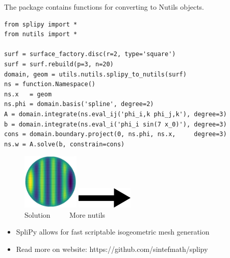 \documentclass[landscape]{sintefposter}
\begin{document}
\begin{multicols}{3}
\vspace{-3.5cm}
\begin{tcolorbox}[colback=white,colframe=sintefblue,title=Integration with Nutils]
  The package contains functions for converting to Nutils objects.
  \begin{tcolorbox}[colback=sinteflightgrey]
  \begin{Verbatim}[fontsize=\footnotesize]
from splipy import *
from nutils import *

surf = surface_factory.disc(r=2, type='square')
surf = surf.rebuild(p=3, n=20)
domain, geom = utils.nutils.splipy_to_nutils(surf)
ns = function.Namespace()
ns.x   = geom
ns.phi = domain.basis('spline', degree=2)
A = domain.integrate(ns.eval_ij('phi_i,k phi_j,k'), degree=3)
b = domain.integrate(ns.eval_i('phi_i sin(7 x_0)'), degree=3)
cons = domain.boundary.project(0, ns.phi, ns.x,     degree=3)
ns.w = A.solve(b, constrain=cons)
\end{Verbatim}
  \end{tcolorbox}
\end{tcolorbox}
\vspace{-1cm}
\begin{figure}
  \begin{center}
    \includegraphics[width=0.24\textwidth]{nutilssolution}
    \includegraphics[width=0.24\textwidth]{right.png} \\
    Solution $\quad\quad$ More nutils
  \end{center}
\end{figure}


\begin{tcolorbox}[colback=sintefblue!10!white,colframe=sintefblue,title=Conclusion]
  \begin{itemize}
    \item SpliPy allows for fast scriptable isogeometric mesh generation
    \item Read more on website: https://github.com/sintefmath/splipy
  \end{itemize}
\end{tcolorbox}
\vspace{1.5cm}


\end{multicols}
\end{document}
